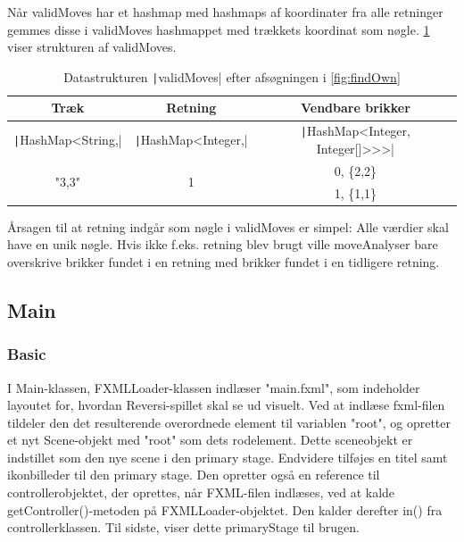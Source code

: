 Når validMoves har et hashmap med hashmaps af koordinater fra alle retninger gemmes disse i validMoves hashmappet med trækkets koordinat som nøgle. \cref{tbl:hashmaps} viser strukturen af validMoves.
\begin{table}[H]
    \centering
    \caption{Datastrukturen \texttt|validMoves| efter afsøgningen i \cref{fig:findOwn}}\label{tbl:hashmaps}
    \begin{tabular}{ccc}
        \toprule
        Træk                               & Retning                             & Vendbare brikker                                 \\
        \midrule
        \texttt|HashMap<String,| & \texttt|HashMap<Integer,| & \texttt|HashMap<Integer, Integer[]>>>| \\
        \multirow{2}{*}{"3,3"}             & \multirow{2}{*}{1}                  & 0, \{2,2\}                                       \\
                                           &                                     & 1, \{1,1\}                                       \\
        \bottomrule
    \end{tabular}
\end{table}
Årsagen til at retning indgår som nøgle i validMoves er simpel: Alle værdier skal have en unik nøgle. Hvis ikke f.eks. retning blev brugt ville moveAnalyser bare overskrive brikker fundet i en retning med brikker fundet i en tidligere retning.
\subsection{Main}

\subsubsection{Basic}\label{bm}
I Main-klassen, FXMLLoader-klassen indlæser "main.fxml", som indeholder layoutet for, hvordan Reversi-spillet skal se ud visuelt. Ved at indlæse fxml-filen tildeler den det resulterende overordnede element til variablen "root", og opretter et nyt Scene-objekt med "root" som dets rodelement. Dette sceneobjekt er indstillet som den nye scene i den primary stage. Endvidere tilføjes en titel samt ikonbilleder til den primary stage. Den opretter også en reference til controllerobjektet, der oprettes, når FXML-filen indlæses, ved at kalde getController()-metoden på FXMLLoader-objektet. Den kalder derefter in() fra controllerklassen. Til sidste, viser dette primaryStage til brugen.

